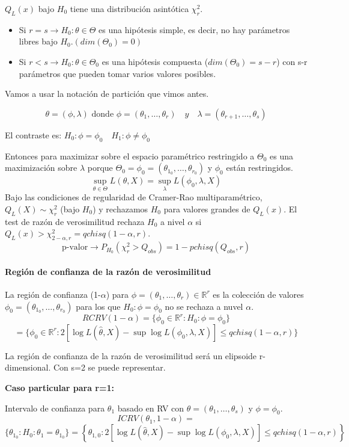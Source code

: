 $Q_L(x)$ bajo $H_0$ tiene una distribución asintótica $\chi^2_r$.
\begin{itemize}
    \item Si $r=s \to H_0:\theta \in \Theta$ es una hipótesis simple, es decir, no hay parámetros libres bajo $H_0.(dim(\Theta_0)=0)$
    \item Si $r<s \to H_0:\theta \in \Theta_0$ es una hipótesis compuesta ($dim(\Theta_0)=s-r$) con s-r parámetros que pueden tomar varios valores posibles.
\end{itemize}

Vamos a usar la notación de partición que vimos antes.

\[
\theta=(\phi,\lambda) \text{ donde } \phi=(\theta_1,\dots,\theta_r) \quad y \quad \lambda=(\theta_{r+1},\dots,\theta_s)
\]

El contraste es: $H_0:\phi=\phi_0 \quad H_1:\phi \neq \phi_0$

Entonces para maximizar sobre el espacio paramétrico restringido a $\Theta_0$ es una maximización sobre $\lambda$ porque
$\Theta_0=\phi_0=(\theta_{1_0},\dots,\theta_{r_0})$ y $\phi_0$ están restringidos.
$$\sup_{\theta \in \Theta}L(\theta,X)=\sup_\lambda L(\phi_0,\lambda,X)$$
\newpage
Bajo las condiciones de regularidad de Cramer-Rao multiparamétrico, 
$Q_L(X) \sim \chi^2_r$ (bajo $H_0$)
y rechazamos $H_0$ para valores grandes de $Q_L(x)$. El test de razón de verosimilitud rechaza $H_0$ a nivel $\alpha$ si $Q_L(x)>\chi^2_{2-\alpha,r}=qchisq(1-\alpha,r)$.
\[
\text{p-valor} \to P_{H_0}(\chi^2_r>Q_{obs})=1-pchisq(Q_{obs},r)
\]
\paragraph{Región de confianza de la razón de verosimilitud}

La región de confianza (1-$\alpha$) para $\phi=(\theta_1,\dots,\theta_r)\in \mathbb{R}^r$ es la colección de valores
$\phi_0=(\theta_{1_0},\dots,\theta_{r_0})$ para los que $H_0:\phi=\phi_0$ no se rechaza a nuvel $\alpha$.
\[
RCRV(1-\alpha)=\{\phi_0 \in \mathbb{R}^r:H_0:\phi=\phi_0\}
\]\[
    =\{\phi_0 \in \mathbb{R}^r:2[\log L(\widehat{\theta},X)-\sup \log L(\phi_0,\lambda,X)] \leq qchisq(1-\alpha,r)\}
\]

La región de confianza de la razón de verosimilitud será un elipsoide r-dimensional. Con s=2 se puede representar.

\textbf{Caso particular para r=1:}

Intervalo de confianza para $\theta_1$ basado en RV con $\theta=(\theta_1,\dots,\theta_s)$ y $\phi=\phi_0$.
\[
ICRV(\theta_1,1-\alpha)=
\]\[\{\theta_{1_0}:H_0:\theta_1=\theta_{1_0}\}
= \left\{ \theta_{1,0} : 2\left[\log L(\widehat{\theta},X) - \sup \log L(\phi_0, \lambda, X)\right] \leq qchisq(1 - \alpha, r) \right\}
\]

